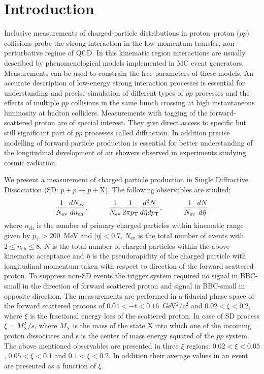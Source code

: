\chapter{Introduction}\label{chapter:introduction}
Inclusive measurements of charged-particle distributions in proton–proton ($pp$) collisions probe the strong interaction in the low-momentum transfer, non-perturbative regime of \ac{QCD}. In this kinematic region interactions are usually described by phenomenological models implemented in \ac{MC} event generators. Measurements can be used to constrain the free parameters of these models. An accurate description of low-energy strong interaction processes is essential for understanding and precise simulation of different types of $pp$ processes and the effects of multiple $pp$ collisions in the same bunch crossing at high instantaneous luminosity at hadron colliders. Measurements with tagging of the forward-scattered proton are of special interest. They give direct access to specific but still significant part of $pp$ processes called diffraction. In addition precise modelling of forward particle production is essential for better understanding of the longitudinal development of air showers observed in experiments studying cosmic radiation.

We present a measurement of charged particle production in Single Diffractive Dissociation (SD: $p+p\to p+\textrm{X}$). The following observables are studied:
\begin{equation}
\frac{1}{N_\textrm{ev}}\frac{dN_\textrm{ev}}{dn_\textrm{ch}},\textrm{\hspace{1cm}} 
\frac{1}{N_\textrm{ev}}\frac{1}{2\pi p_\textrm{T}}\frac{d^2N}{d\bar{\eta}dp_\textrm{T}},\textrm{\hspace{1cm}} 
\frac{1}{N_\textrm{ev}}\frac{dN}{d\bar{\eta}}
\end{equation}
where $n_\textrm{ch}$ is the number of primary charged particles within kinematic range given by $p_\textrm{T}>200$~MeV and $|\eta|<0.7$, $N_\textrm{ev}$ is the 
total number of events with $2\leq n_\textrm{ch}\leq8$, $N$ is the total number of charged particles within the above kinematic acceptance and $\bar{\eta}$ is the pseudorapidity of the charged particle with longitudinal momentum taken with respect to direction of the forward scattered proton. To suppress non-SD events the trigger system required no signal in BBC-small in the direction of forward scattered proton and signal in BBC-small in opposite direction. The 
measurements are performed in a fiducial phase space of the forward scattered protons of $0.04<-t<0.16$~GeV$^2$/c$^2$ and 
$0.02<\xi<0.2$, where $\xi$ is the fractional energy loss of the scattered proton. In case of SD process $\xi=M^2_\textrm{X}/s$, where $M_\textrm{X}$ is 
the mass of the state $\textrm{X}$ into which one of the incoming proton dissociates and s is the center of mass energy squared of the $pp$ system. The above mentioned observables are presented in three $\xi$ 
regions: $0.02<\xi<0.05$, $0.05<\xi<0.1$ and $0.1<\xi<0.2$. In addition their average values in an event are presented as a function of $\xi$.

